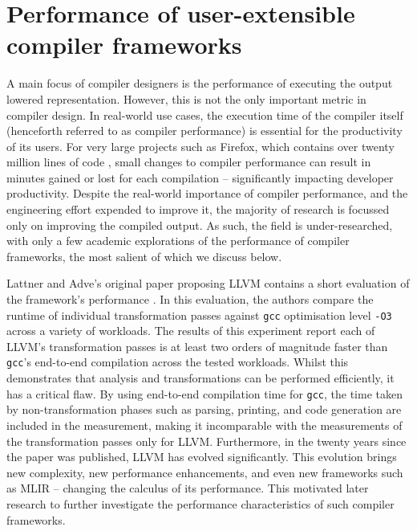 \section{Performance of user-extensible compiler frameworks}
\label{sec:perf-user-extensible-frameworks}

A main focus of compiler designers is the performance of executing the output lowered representation. However, this is not the only important metric in compiler design.
In real-world use cases, the execution time of the compiler itself (henceforth referred to as compiler performance) is essential for the productivity of its users. For very large projects such as Firefox, which contains over twenty million lines of code \cite{bastienabadieEngineeringCodeQuality}, small changes to compiler performance can result in minutes gained or lost for each compilation -- significantly impacting developer productivity.
Despite the real-world importance of compiler performance, and the engineering effort expended to improve it, the majority of research is focussed only on improving the compiled output. %
As such, the field is under-researched, with only a few academic explorations of the performance of compiler frameworks, the most salient of which we discuss below.

Lattner and Adve's original paper proposing LLVM contains a short evaluation of the framework's performance \cite[Section 4.1.4]{lattnerLLVMCompilationFramework2004}.
In this evaluation, the authors compare the runtime of individual transformation passes against \texttt{gcc} optimisation level \texttt{-O3} across a variety of workloads.
The results of this experiment \cite[Table 2]{lattnerLLVMCompilationFramework2004} report each of LLVM's transformation passes is at least two orders of magnitude faster than \texttt{gcc}'s end-to-end compilation across the tested workloads. Whilst this demonstrates that analysis and transformations can be performed efficiently, it has a critical flaw. By using end-to-end compilation time for \texttt{gcc}, the time taken by non-transformation phases such as parsing, printing, and code generation are included in the measurement, making it incomparable with the measurements of the transformation passes only for LLVM.
Furthermore, in the twenty years since the paper was published, LLVM has evolved significantly. This evolution brings new complexity, new performance enhancements, and even new frameworks such as MLIR -- changing the calculus of its performance.
This motivated later research to further investigate the performance characteristics of such compiler frameworks.

